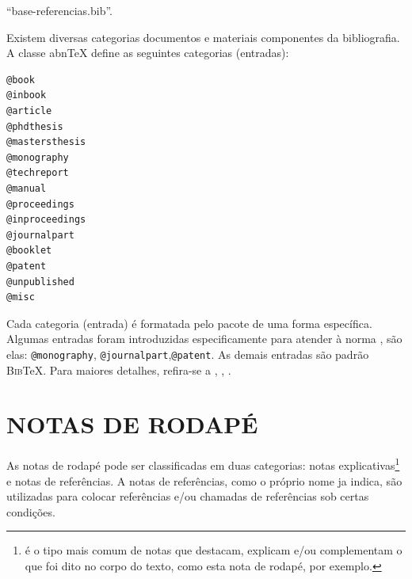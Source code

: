 \begin{center}
``base-referencias.bib''.
\end{center}

Existem diversas categorias documentos e materiais componentes da bibliografia. A classe abn\TeX{} define as seguintes categorias (entradas):

\begin{verbatim}
@book
@inbook
@article
@phdthesis
@mastersthesis
@monography
@techreport
@manual
@proceedings
@inproceedings
@journalpart
@booklet
@patent
@unpublished
@misc
\end{verbatim}

Cada categoria (entrada) é formatada pelo pacote  de uma forma específica. Algumas entradas foram introduzidas especificamente para atender à norma , são elas: \verb|@monography|, \verb|@journalpart|,\verb|@patent|. As demais entradas são padrão \textsc{Bib}\TeX{}. Para maiores detalhes, refira-se a , , .

\section{NOTAS DE RODAPÉ}
\label{sec:notasRodape}

As notas de rodapé pode ser classificadas em duas categorias: notas explicativas\footnote{é o tipo mais comum de notas que destacam, explicam e/ou complementam o que foi dito no corpo do texto, como esta nota de rodapé, por exemplo.} e notas de referências. A notas de referências, como o próprio nome ja indica, são utilizadas para colocar referências e/ou chamadas de referências sob certas condições.
